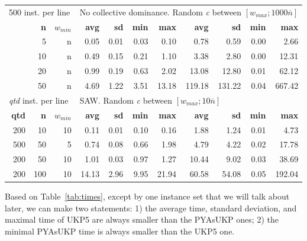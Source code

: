 \documentclass[runningheads,a4paper]{llncs}
\begin{document}
\begin{table}
\begin{tabular}{@{\extracolsep{4pt}}rrrrrrrrrrr@{}}
\multicolumn{3}{l}{500 inst. per line} & \multicolumn{8}{l}{No collective dominance. Random \emph{c} between \([w_{max}; 1000\overline{n}]\)}\\
\cline{1-3}\cline{4-11}
& \textbf{n} & \(w_{min}\) & \textbf{avg} & \textbf{sd} & \textbf{min} & \textbf{max} & \textbf{avg} & \textbf{sd} & \textbf{min} & \textbf{max}\\
\cline{1-3}\cline{4-7}\cline{8-11}
&  5 & n & 0.05 & 0.01 & 0.03 & 0.10 & 0.78 & 0.59 & 0.00 & 2.66\\
& 10 & n & 0.49 & 0.15 & 0.21 & 1.10 & 3.38 & 2.80 & 0.00 & 12.31\\
& 20 & n & 0.99 & 0.19 & 0.63 & 2.02 & 13.08 & 12.80 & 0.01 & 62.12\\
& 50 & n & 4.69 & 1.22 & 3.51 & 13.18 & 119.18 & 131.22 & 0.04 & 667.42\\
\hline

\multicolumn{3}{l}{\emph{qtd} inst. per line} & \multicolumn{8}{l}{SAW. Random \emph{c} between \([w_{max}; 10\overline{n}]\)}\\
\cline{1-3}\cline{4-11}
\textbf{qtd} & \textbf{n} & \(w_{min}\) & \textbf{avg} & \textbf{sd} & \textbf{min} & \textbf{max} & \textbf{avg} & \textbf{sd} & \textbf{min} & \textbf{max}\\
\cline{1-3}\cline{4-7}\cline{8-11}
~200 &  10 & 10 & 0.11 & 0.01 & 0.10 & 0.16 & 1.88 & 1.24 & 0.01 & 4.73\\
~500 &  50 &  5 & 0.74 & 0.08 & 0.66 & 1.98 & 4.79 & 4.22 & 0.02 & 17.78\\
~200 &  50 & 10 & 1.01 & 0.03 & 0.97 & 1.27 & 10.44 & 9.02 & 0.03 & 38.69\\
~200 & 100 & 10 & 14.13 & 2.96 & 9.95 & 21.94 & 60.58 & 54.08 & 0.05 & 192.04\\
\hline

\end{tabular}
\end{table}
Based on Table~\ref{tab:times}, except by one instance set that we will talk about later, we can make two statements: 1) the average time, standard deviation, and maximal time of UKP5 are always smaller than the PYAsUKP ones; 2) the minimal PYAsUKP time is always smaller than the UKP5 one.
\end{document}
